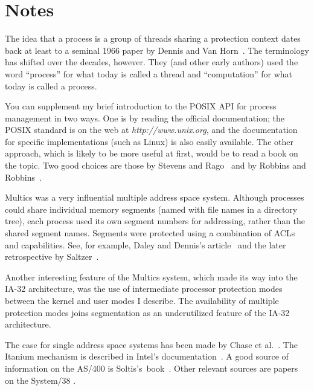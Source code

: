 \section*{Notes}
The idea that a process is a group of threads sharing a protection
context dates back at least to a seminal 1966 paper by Dennis and Van
Horn~\cite{max1090}.  The terminology has shifted over the decades,
however.  They (and other early authors) used the word ``process'' for
what today is called a thread and ``computation'' for what today is called a
process.

You can supplement my brief introduction to the POSIX API for process
management in two ways.  One is by reading the official documentation;
the POSIX standard is on the web at \textit{http://www.unix.org}, and the
documentation for specific implementations (such as Linux) is also
easily available.  The other approach, which is likely to be more
useful at first, would be to read a book on the topic.  Two good choices
are those by Stevens and Rago~\cite{max1101} and by
Robbins and
Robbins~\cite{max1102}.

Multics was a very influential multiple address space system.
Although processes could share individual memory segments (named with
file names in a directory tree), each process used its own segment
numbers for addressing, rather than the shared segment names.
Segments were protected using a combination of ACLs and capabilities.
See, for example, Daley and Dennis's article~\cite{max1036} and the later retrospective
by Saltzer~\cite{max1045}.

Another interesting feature of the Multics system, which made its way
into the IA-32 architecture, was the use of intermediate processor
protection modes between the kernel and user modes I describe.  The
availability of multiple protection modes joins segmentation as an
underutilized feature of the IA-32 architecture.

The case for single address space systems has been made by
Chase et al.~\cite{max1039}.  The
Itanium mechanism is described in Intel's
documentation~\cite{max1064}.  A good source of information on the
AS/400 is Soltis's~book~\cite{max1091}.  Other relevant sources are papers on
the System/38 \cite{max1082,max1079,max1078}.

